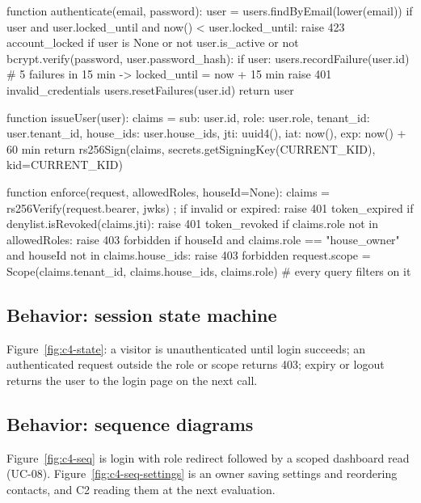 \begin{Shaded}
\begin{Code}
function authenticate(email, password):
    user = users.findByEmail(lower(email))
    if user and user.locked_until and now() < user.locked_until: raise 423 account_locked
    if user is None or not user.is_active or not bcrypt.verify(password, user.password_hash):
        if user: users.recordFailure(user.id)          # 5 failures in 15 min -> locked_until = now + 15 min
        raise 401 invalid_credentials
    users.resetFailures(user.id)
    return user

function issueUser(user):
    claims = { sub: user.id, role: user.role, tenant_id: user.tenant_id, house_ids: user.house_ids,
               jti: uuid4(), iat: now(), exp: now() + 60 min }
    return rs256Sign(claims, secrets.getSigningKey(CURRENT_KID), kid=CURRENT_KID)

function enforce(request, allowedRoles, houseId=None):
    claims = rs256Verify(request.bearer, jwks)          ; if invalid or expired: raise 401 token_expired
    if denylist.isRevoked(claims.jti):                  raise 401 token_revoked
    if claims.role not in allowedRoles:                 raise 403 forbidden
    if houseId and claims.role == "house_owner" and houseId not in claims.house_ids: raise 403 forbidden
    request.scope = Scope(claims.tenant_id, claims.house_ids, claims.role)      # every query filters on it
\end{Code}
\end{Shaded}

\subsection{Behavior: session state machine}
Figure~\ref{fig:c4-state}: a visitor is unauthenticated until login succeeds; an authenticated request outside the
role or scope returns 403; expiry or logout returns the user to the login page on the next call.


\subsection{Behavior: sequence diagrams}
Figure~\ref{fig:c4-seq} is login with role redirect followed by a scoped dashboard read (UC-08). Figure~\ref{fig:c4-seq-settings}
is an owner saving settings and reordering contacts, and C2 reading them at the next evaluation.

